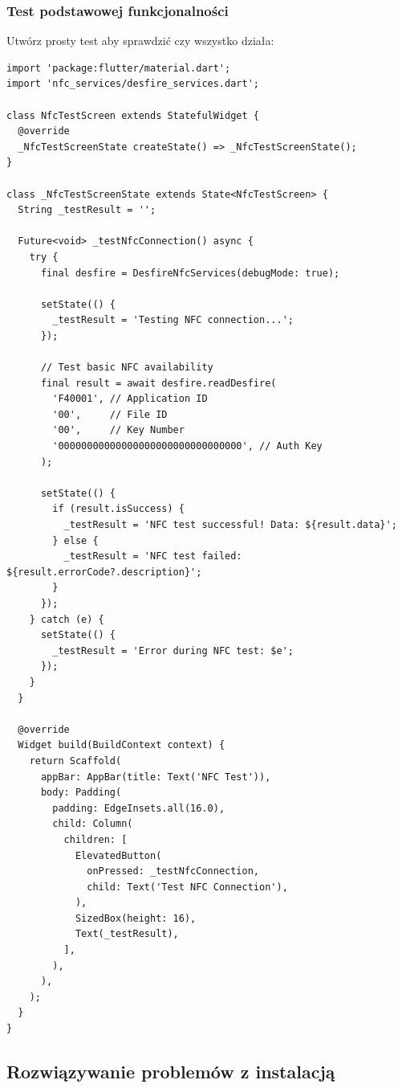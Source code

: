 \documentclass[a4paper,12pt]{article}
\begin{document}
\subsubsection{Test podstawowej funkcjonalności}
Utwórz prosty test aby sprawdzić czy wszystko działa:

\begin{lstlisting}
import 'package:flutter/material.dart';
import 'nfc_services/desfire_services.dart';

class NfcTestScreen extends StatefulWidget {
  @override
  _NfcTestScreenState createState() => _NfcTestScreenState();
}

class _NfcTestScreenState extends State<NfcTestScreen> {
  String _testResult = '';

  Future<void> _testNfcConnection() async {
    try {
      final desfire = DesfireNfcServices(debugMode: true);
      
      setState(() {
        _testResult = 'Testing NFC connection...';
      });
      
      // Test basic NFC availability
      final result = await desfire.readDesfire(
        'F40001', // Application ID
        '00',     // File ID
        '00',     // Key Number
        '00000000000000000000000000000000', // Auth Key
      );
      
      setState(() {
        if (result.isSuccess) {
          _testResult = 'NFC test successful! Data: ${result.data}';
        } else {
          _testResult = 'NFC test failed: ${result.errorCode?.description}';
        }
      });
    } catch (e) {
      setState(() {
        _testResult = 'Error during NFC test: $e';
      });
    }
  }

  @override
  Widget build(BuildContext context) {
    return Scaffold(
      appBar: AppBar(title: Text('NFC Test')),
      body: Padding(
        padding: EdgeInsets.all(16.0),
        child: Column(
          children: [
            ElevatedButton(
              onPressed: _testNfcConnection,
              child: Text('Test NFC Connection'),
            ),
            SizedBox(height: 16),
            Text(_testResult),
          ],
        ),
      ),
    );
  }
}
\end{lstlisting}

\subsection{Rozwiązywanie problemów z instalacją}
\end{document}
